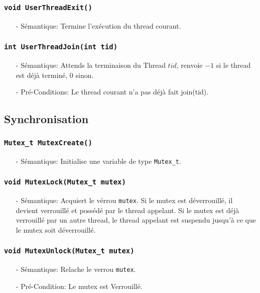 \documentclass[11pt]{article}
\begin{document}
\subsubsection{\texttt{void UserThreadExit()}}
\begin{itemize}
\item[-] Sémantique: Termine l'exécution du thread courant.
\end{itemize}

\subsubsection{\texttt{int UserThreadJoin(int tid)}}
\begin{itemize}
\item[-] Sémantique: Attends la terminaison du Thread $tid$, renvoie $-1$
  si le thread est déjà terminé, $0$ sinon.
\item[-] Pré-Conditions: Le thread courant n'a pas déjà fait join(tid).
\end{itemize}

\subsection{Synchronisation}
\subsubsection{\texttt{Mutex\_t MutexCreate()}}
\begin{itemize}
\item[-]Sémantique: Initialise une variable de type \texttt{Mutex\_t}.
\end{itemize}

\subsubsection{\texttt{void MutexLock(Mutex\_t mutex)}}
\begin{itemize}
\item[-]Sémantique: Acquiert le vérrou \texttt{mutex}. Si le mutex est déverrouillé, il devient verrouillé
  et possédé par le thread appelant. Si le mutex est déjà verrouillé par un autre thread,
  le thread appelant est suspendu jusqu'à ce que le mutex soit déverrouillé.
\end{itemize}

\subsubsection{\texttt{void MutexUnlock(Mutex\_t mutex)}}
\begin{itemize}
\item[-]Sémantique: Relache le verrou \texttt{mutex}.
\item[-]Pré-Condition: Le mutex est Verrouillé.
\end{itemize}
\end{document}
